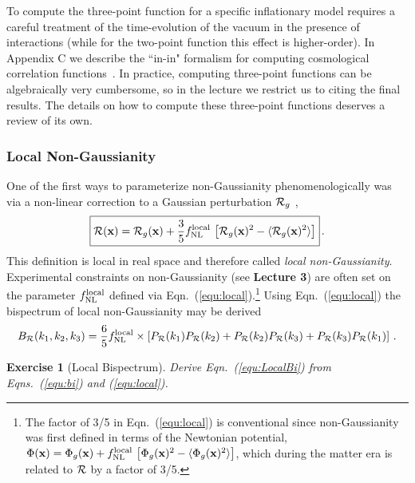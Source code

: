 \documentclass[12pt,letterpaper,rotate]{article}
\def\beq{\begin{equation}}
\def\eeq{\end{equation}}
\def\R{{\cal R}}
\newtheorem{thm}{Exercise}
\begin{document}
{To compute the three-point function for a specific inflationary model requires a careful treatment of the time-evolution of the vacuum in the presence of interactions (while for the two-point function this effect is higher-order).
In Appendix C we describe the ``in-in" formalism for computing cosmological correlation functions~\cite{Schwinger:1960qe, Calzetta:1986ey,Jordan:1986ug, malda, Weinberg:2005vy}. In practice, computing three-point functions can be algebraically very cumbersome, so in the lecture we restrict us to citing the final results.
The details on how to compute these three-point functions deserves a review of its own.

\subsubsection{Local Non-Gaussianity}

One of the first ways to parameterize non-Gaussianity phenomenologically was via a non-linear correction to a Gaussian perturbation $\R_g$ \cite{komatsu01},
\beq
\label{equ:local}
\fbox{$\displaystyle
\R({\bf x}) = \R_g({\bf x}) + \frac{3}{5}f_{\rm NL}^{\rm local}\, \left[\R_g({\bf x})^2 - \langle \R_g({\bf x})^2\rangle \right]$}\, .
\eeq
This definition is local in real space and therefore called {\it local non-Gaussianity}.
Experimental constraints on non-Gaussianity (see {\bf Lecture 3}) are often set on the parameter $f_{\rm NL}^{\rm local}$ defined via Eqn.~(\ref{equ:local}).\footnote{The factor of 3/5 in Eqn.~(\ref{equ:local}) is conventional since non-Gaussianity was first defined in terms of the Newtonian potential, $\Phi({\bf x}) = \Phi_g({\bf x}) + f_{\rm NL}^{\rm local} \, \left[\Phi_g({\bf x})^2 - \langle \Phi_g({\bf x})^2\rangle \right]$, which during the matter era is related to $\R$ by a factor of 3/5.}
Using Eqn.~(\ref{equ:local}) the bispectrum of local non-Gaussianity may be derived
\beq
B_\R(k_1, k_2, k_3) = \frac{6}{5} f_{\rm NL}^{\rm local} \times \left[ P_\R(k_1) P_\R(k_2) + P_\R(k_2) P_\R(k_3)+ P_\R(k_3) P_\R(k_1)\right]\, .
\label{equ:LocalBi}
\eeq

\begin{thm}[Local Bispectrum]
Derive Eqn.~(\ref{equ:LocalBi}) from Eqns.~(\ref{equ:bi}) and (\ref{equ:local}).
  \end{thm}
 
}
\end{document}

